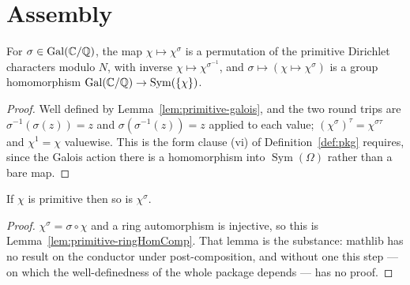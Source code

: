 \section{Assembly}

\begin{definition}
  \label{def:galoisAction}
  \leanok
  For $\sigma \in \operatorname{Gal}(\mathbb{C}/\mathbb{Q})$, the map $\chi \mapsto \chi^{\sigma}$ is a
  permutation of the primitive Dirichlet characters modulo $N$, with inverse
  $\chi \mapsto \chi^{\sigma^{-1}}$, and $\sigma \mapsto (\chi \mapsto \chi^{\sigma})$ is a
  group homomorphism $\operatorname{Gal}(\mathbb{C}/\mathbb{Q}) \to \operatorname{Sym}(\{\chi\})$.
\end{definition}
\begin{proof}
  \leanok
  Well defined by Lemma~\ref{lem:primitive-galois}, and the two round trips are
  $\sigma^{-1}(\sigma(z)) = z$ and $\sigma(\sigma^{-1}(z)) = z$ applied to each value;
  $(\chi^{\sigma})^{\tau} = \chi^{\sigma\tau}$ and $\chi^{1} = \chi$ valuewise. This is the
  form clause (vi) of Definition~\ref{def:pkg} requires, since the Galois action there is a
  homomorphism into $\operatorname{Sym}(\Omega)$ rather than a bare map.
\end{proof}

\begin{lemma}
  \label{lem:primitive-galois}
  \leanok
  If $\chi$ is primitive then so is $\chi^{\sigma}$.
\end{lemma}
\begin{proof}
  \leanok
  $\chi^{\sigma} = \sigma \circ \chi$ and a ring automorphism is injective, so this is
  Lemma~\ref{lem:primitive-ringHomComp}. That lemma is the substance: mathlib has no
  result on the conductor under post-composition, and without one this step --- on which
  the well-definedness of the whole package depends --- has no proof.
\end{proof}

